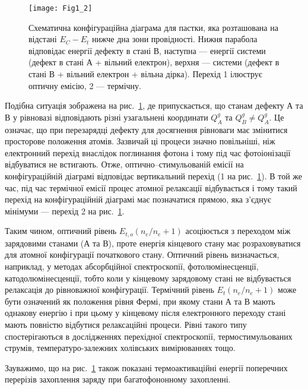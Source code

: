 \begin{figure}[t]
\center
\vspace{-5mm}
\texttt{[image: Fig1\_2]}
\vspace{-3mm}
\caption{Схематична конфігураційна діаграма для пастки,
яка розташована на відстані $E_C-E_{t}$ нижче дна зони провідності.
Нижня парабола відповідає енергії дефекту в стані В,
наступна --- енергії системи (дефект в стані А + вільний електрон),
верхня --- системи (дефект в стані В + вільний електрон + вільна дірка). %
Перехід 1 ілюструє оптичну емісію, 2 --- термічну.}
\vspace{-3mm}
\label{F12}
\end{figure}

Подібна ситуація зображена на рис.~\ref{F12},
де припускається, що станам дефекту А та В у рівновазі
відповідають різні узагальнені координати $Q_A^g$ та $Q_B^g\neq Q_A^g$.
Це означає, що при перезарядці дефекту для досягнення рівноваги
має змінитися просторове положення атомів.
Зазвичай ці процеси значно повільніші, ніж електронний перехід
внаслідок поглинання фотона і тому під час фотоіонізації відбуватися не встигають.
Отже, оптично--стимульованій емісії на конфігураційній діаграмі відповідає вертикальний перехід
(1 на рис.~\ref{F12}).
В той же час, під час термічної емісії процес атомної релаксації  відбувається і тому
такий перехід на конфігураційній діаграмі має позначатися прямою, яка з'єднує мінімуми ---
перехід 2 на рис.~\ref{F12}.

Таким чином, оптичний рівень $E_{t,o}(n_e/n_e+1)$ асоціюється
з переходом між зарядовими станами (А та В), проте енергія кінцевого
стану має розраховуватися для атомної конфігурації початкового стану.
Оптичний рівень визначається, наприклад, у методах абсорбційної спектроскопії,
фотолюмінесценції, катодолюмінесценції, тобто коли у кінцевому
зарядовому стані не відбувається релаксація до рівноважної конфігурації.
Термічний рівень $E_{t}(n_e/n_e+1)$ може бути означений як положення рівня Фермі,
при якому стани А та В мають однакову енергію і при цьому у кінцевому після електронного переходу стані
мають повністю відбутися релаксаційні процеси.
Рівні такого типу спостерігаються в дослідженнях перехідної спектроскопії,
термостимульованих струмів, температуро-залежних холівських вимірюваннях тощо.

Зауважимо, що на рис.~\ref{F12} також показані термоактиваційні енергії поперечних перерізів захоплення
заряду при багатофононному захопленні.
